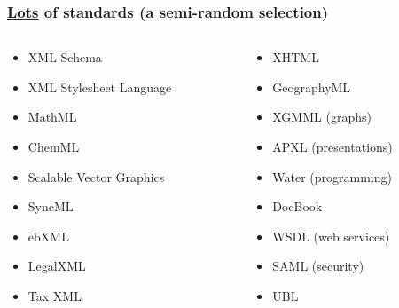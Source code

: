 

\frame
{
	\frametitle{\uline{Lots} of standards (a semi-random selection)}
	
	\begin{columns}
		\begin{column}{5cm}
			\begin{itemize}
			
				\item XML Schema
				
				\item XML Stylesheet Language
				
				\item MathML
				
				\item ChemML
				
				\item Scalable Vector Graphics
				
				\item SyncML
				
				\item ebXML
				
				\item LegalXML
				
				\item Tax XML
			
			\end{itemize}
		\end{column}

		\begin{column}{5cm}
			\begin{itemize}
			
				\item XHTML
				
				\item GeographyML
				
				\item XGMML (graphs)
				
				\item APXL (presentations)
				
				\item Water (programming)
				
				\item DocBook
				
				\item WSDL (web services)
				
				\item SAML (security)
				
				\item UBL
			
			\end{itemize}
		\end{column}
	\end{columns}
	
}


